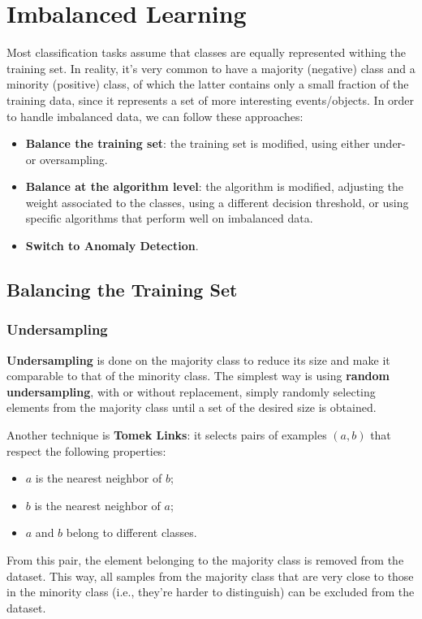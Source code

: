 \chapter{Imbalanced Learning}

Most classification tasks assume that classes are equally represented withing the training set. In reality, it's very common to have a majority (negative) class and a minority (positive) class, of which the latter contains only a small fraction of the training data, since it represents a set of more interesting events/objects. In order to handle imbalanced data, we can follow these approaches:
\begin{itemize}
    \item \textbf{Balance the training set}: the training set is modified, using either under- or oversampling.
    \item \textbf{Balance at the algorithm level}: the algorithm is modified, adjusting the weight associated to the classes, using a different decision threshold, or using specific algorithms that perform well on imbalanced data.
    \item \textbf{Switch to Anomaly Detection}.
\end{itemize}

\section{Balancing the Training Set}

\subsection{Undersampling}

\textbf{Undersampling} is done on the majority class to reduce its size and make it comparable to that of the minority class. The simplest way is using \textbf{random undersampling}, with or without replacement, simply randomly selecting elements from the majority class until a set of the desired size is obtained.

Another technique is \textbf{Tomek Links}: it selects pairs of examples $(a,b)$ that respect the following properties:
\begin{itemize}
    \item $a$ is the nearest neighbor of $b$;
    \item $b$ is the nearest neighbor of $a$;
    \item $a$ and $b$ belong to different classes.
\end{itemize}
From this pair, the element belonging to the majority class is removed from the dataset. This way, all samples from the majority class that are very close to those in the minority class (i.e., they're harder to distinguish) can be excluded from the dataset.


